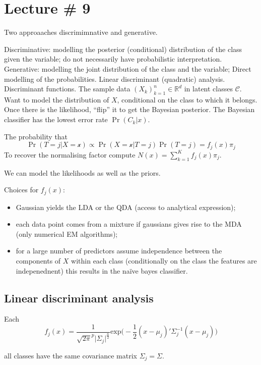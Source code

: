 \documentclass[a4paper]{article}
\newcommand{\Real}{\mathbb{R}}
\newcommand{\Ccal}{\mathcal{C}}
\begin{document}

\section{Lecture \# 9} %
\label{sec:lecture_9}

Two approaaches discrimimnative and generative.

Discriminative: modelling the posterior (conditional) distribution of the class given the variable; do not necessarily have probabilistic interpretation.
Generative: modelling the joint distribution of the class and the variable;
Direct modelling of the probabilities.
Linear discriminant (quadratic) analysis.
Discriminant functions.
The sample data $(X_k)_{k=1}^n\in \Real^d$ in latent classes $\Ccal$. Want to model the distribution of $X$, conditional on the class to which it belongs.
Once there is the likelihood, ``flip'' it to get the Bayesian posterior. The Bayesian classifier has the lowest error rate $\Pr(C_k\vert x)$.

The probability that 
\[\Pr(T = j\vert X = \mathcal{x}) \propto \Pr(X = \mathcal{x}\vert T = j) \Pr( T = j ) = f_j(x) \pi_j\]
To recover the normalising factor compute $N(x) = \sum_{k=1}^K f_j(x) \pi_j$.

We can model the likelihoods as well as the priors.

Choices for $f_j(x)$: \begin{itemize}
	\item Gaussian yields the LDA or the QDA (access to analytical expression);
	\item each data point comes from a mixture if gaussians gives rise to the MDA (only numerical EM algorithms);
	\item for a large number of predictors assume independence between the components of $X$ within each class (conditionally on the class the features are indepenednent) this results in the na\"ive bayes classifier.
\end{itemize}


\subsection{Linear discriminant analysis} %
\label{sub:linear_discriminant_analysis}

Each
\[f_j(x) = \frac{1}{\sqrt{2\pi}^p \lvert \Sigma_j\rvert^\frac{n}{2}} \text{exp}\bigg(-\frac{1}{2}(x-\mu_j)'\Sigma_j^{-1}(x-\mu_j)\bigg)\]

all classes have the same covariance matrix $\Sigma_j = \Sigma$.
\end{document}
